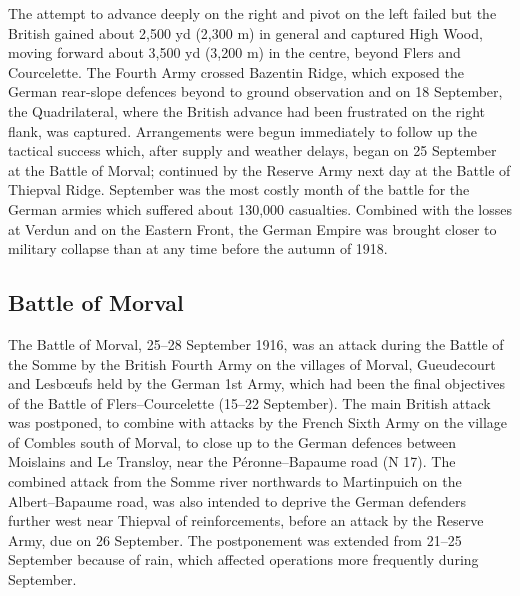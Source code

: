 \documentclass[a4paper,]{book}
\begin{document}
The attempt to advance deeply on the right and pivot on the left failed but the British gained about 2,500 yd (2,300 m) in general and captured High Wood, moving forward about 3,500 yd (3,200 m) in the centre, beyond Flers and Courcelette. The Fourth Army crossed Bazentin Ridge, which exposed the German rear-slope defences beyond to ground observation and on 18 September, the Quadrilateral, where the British advance had been frustrated on the right flank, was captured. Arrangements were begun immediately to follow up the tactical success which, after supply and weather delays, began on 25 September at the Battle of Morval; continued by the Reserve Army next day at the Battle of Thiepval Ridge. September was the most costly month of the battle for the German armies which suffered about 130,000 casualties. Combined with the losses at Verdun and on the Eastern Front, the German Empire was brought closer to military collapse than at any time before the autumn of 1918. 

\subsection{Battle of Morval}

The Battle of Morval, 25–28 September 1916, was an attack during the Battle of the Somme by the British Fourth Army on the villages of Morval, Gueudecourt and Lesbœufs held by the German 1st Army, which had been the final objectives of the Battle of Flers–Courcelette (15–22 September). The main British attack was postponed, to combine with attacks by the French Sixth Army on the village of Combles south of Morval, to close up to the German defences between Moislains and Le Transloy, near the Péronne–Bapaume road (N 17). The combined attack from the Somme river northwards to Martinpuich on the Albert–Bapaume road, was also intended to deprive the German defenders further west near Thiepval of reinforcements, before an attack by the Reserve Army, due on 26 September. The postponement was extended from 21–25 September because of rain, which affected operations more frequently during September.
\end{document}
